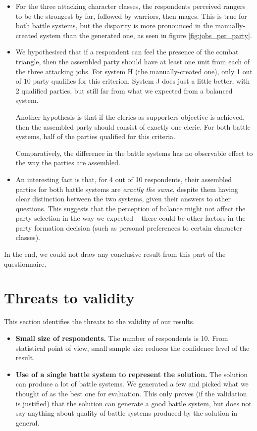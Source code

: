 \begin{itemize}
	\item For the three attacking character classes, the respondents perceived rangers to be the strongest by far, followed by warriors, then mages. This is true for both battle systems, but the disparity is more pronounced in the manually-created system than the generated one, as seen in figure \ref{fig:jobs_per_party}.
	
	\item We hypothesised that if a respondent can feel the presence of the combat triangle, then the assembled party should have at least one unit from each of the three attacking jobs. For system H (the manually-created one), only 1 out of 10 party qualifies for this criterion. System J does just a little better, with 2 qualified parties, but still far from what we expected from a balanced system. 
	
	Another hypothesis is that if the clerics-as-supporters objective is achieved, then the assembled party should consist of exactly one cleric. For both battle systems, half of the parties qualified for this criteria.
	
	Comparatively, the difference in the battle systems has no observable effect to the way the parties are assembled.
	
	\item An interesting fact is that, for 4 out of 10 respondents, their assembled parties for both battle systems are \textit{exactly the same}, despite them having clear distinction between the two systems, given their answers to other questions. This suggests that the perception of balance might not affect the party selection in the way we expected -- there could be other factors in the party formation decision (such as personal preferences to certain character classes).
\end{itemize}

In the end, we could not draw any conclusive result from this part of the questionnaire.

\section{Threats to validity}

This section identifies the threats to the validity of our results.

\begin{itemize}
	\item \textbf{Small size of respondents.} The number of respondents is 10. From statistical point of view, small sample size reduces the confidence level of the result.
	\item \textbf{Use of a single battle system to represent the solution.} The solution can produce a lot of battle systems. We generated a few and picked what we thought of as the best one for evaluation. This only proves (if the validation is justified) that the solution can generate a good battle system, but does not say anything about quality of battle systems produced by the solution in general.
\end{itemize}

